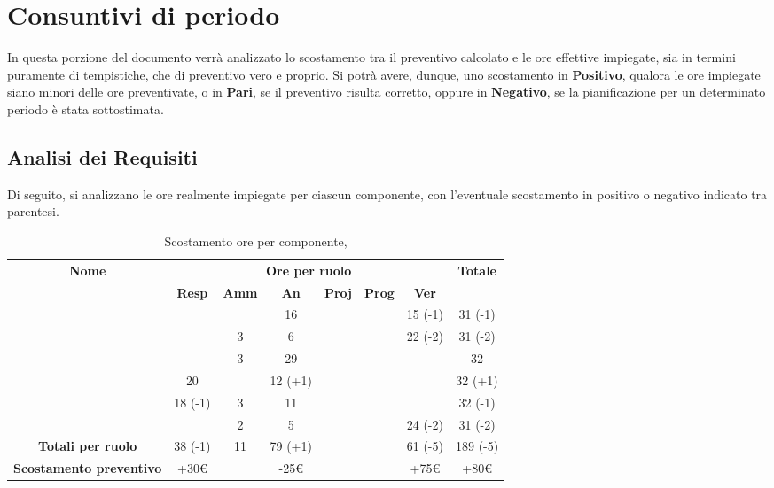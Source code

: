 \newpage

\section{Consuntivi di periodo}

In questa porzione del documento verrà analizzato lo scostamento tra il preventivo calcolato e le ore effettive impiegate, sia in termini puramente di tempistiche, che di preventivo vero e proprio. Si potrà avere, dunque, uno scostamento in \textbf{Positivo}, qualora le ore impiegate siano minori delle ore preventivate, o in \textbf{Pari}, se il preventivo risulta corretto, oppure in \textbf{Negativo}, se la pianificazione per un determinato periodo è stata sottostimata.

\subsection{Analisi dei Requisiti}

Di seguito, si analizzano le ore realmente impiegate per ciascun componente, con l'eventuale scostamento in positivo o negativo indicato tra parentesi.

\begin{table}[H]
	\begin{center}
		\begin{tabular}{|c|c|c|c|c|c|c|c|}
			\hline
			\textbf{Nome} & \multicolumn{6}{c|}{\textbf{Ore per ruolo}} & \textbf{Totale} \\\cline{2-7}
			& \textbf{Resp} & \textbf{Amm} & \textbf{An} & \textbf{Proj} & \textbf{Prog} & \textbf{Ver} & \\
			\hline
			\MC			&		&		&	16	&		&		&	15 (-1)	&	31 (-1)	\\
			\hline
			\AN			&		&	3	&	6	&	 	&		&	22 (-2)	& 	31 (-2)	\\
			\hline
			\DAN		&		&	3	&	29 	&		&		&		&	32	\\
			\hline
			\AS			&	20	&	 	&	12 (+1) 	&		&	 	& 		&	32 (+1)	\\
			\hline
			\NS 		&	18 (-1)	&	3	&	11	&		&		& 		&	32 (-1)	\\
			\hline
			\DS			& 		&	2	&	5	&		&		&	24 (-2)	&	31 (-2)	\\
			\hline
			\textbf{Totali per ruolo}	& 	38 (-1)	&	11	&	79 (+1)	&		&		&	61 (-5)	&	189 (-5)	\\
			\hline
			\textbf{Scostamento preventivo}	& 	+30€	&		&	-25€	&		&		&	+75€	&	+80€	\\
			\hline
		\end{tabular}
	\end{center}
	\caption{Scostamento ore per componente, \AdR}
\end{table}


